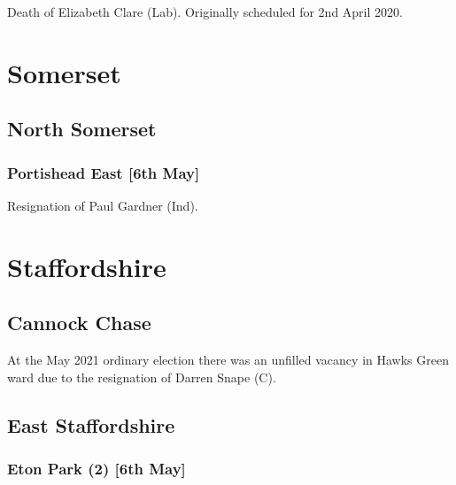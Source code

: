 \documentclass[a4paper,openany]{book}
\begin{document}
\begin{resultsiii}

Death of Elizabeth Clare (Lab).  Originally scheduled for 2nd April 2020.

\section{Somerset}

\subsection*{North Somerset}

\subsubsection*{Portishead East \hspace*{\fill}\nolinebreak[1]%
	\enspace\hspace*{\fill}
	[6th May]}


Resignation of Paul Gardner (Ind).

\section{Staffordshire}

\subsection*{Cannock Chase}

At the May 2021 ordinary election there was an unfilled vacancy in Hawks Green ward due to the resignation of Darren Snape (C).

\subsection*{East Staffordshire}

\subsubsection*{Eton Park (2) \hspace*{\fill}\nolinebreak[1]%
	\enspace\hspace*{\fill}
	[6th May]}


\end{resultsiii}
\end{document}
